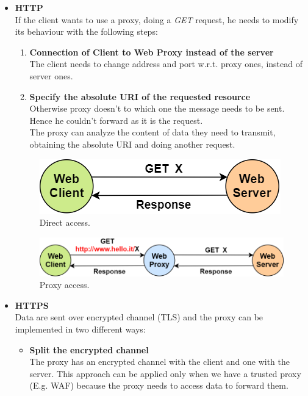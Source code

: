 \begin{itemize}
\item{\textbf{HTTP}\\
If the client wants to use a proxy, doing a \textit{GET} request, he needs to modify its behaviour with the following steps:
\begin{enumerate}
\item{\textbf{Connection of Client to Web Proxy instead of the server}\\
The client needs to change address and port w.r.t. proxy ones, instead of server ones.}
\item{\textbf{Specify the absolute URI of the requested resource}\\
Otherwise proxy doesn't to which one the message needs to be sent. Hence he couldn't forward as it is the request.\\
The proxy can analyze the content of data they need to transmit, obtaining the absolute URI and doing another request.
}
\end{enumerate}
\begin{figure}[h]
\centering
\includegraphics[scale=0.5]{Images/HTTP/direct_access}
\caption{\footnotesize{Direct access.}}\label{direct_access}
\end{figure}
\begin{figure}[h]
\centering
\includegraphics[scale=0.5]{Images/HTTP/proxy_access}
\caption{\footnotesize{Proxy access.}}\label{proxy_access}
\end{figure}
}
\item{\textbf{HTTPS}\\
Data are sent over encrypted channel (TLS) and the proxy can be implemented in two different ways:
\begin{itemize}
\item{\textbf{Split the encrypted channel}\\
The proxy has an encrypted channel with the client and one with the server. This approach can be applied only when we have a trusted proxy (E.g. WAF) because the proxy needs to access data to forward them.
}
\end{itemize}}
\end{itemize}
